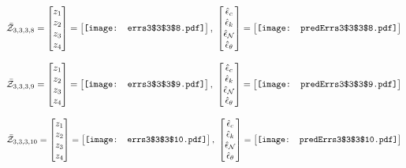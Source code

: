 \documentclass[12pt]{article}
\begin{document}
\begin{gather*}
\bar{\mathcal{Z}}_{3,3,3,8}=\begin{bmatrix}
z_1\\
z_2\\
z_3\\
z_4
 \end{bmatrix}= \begin{bmatrix}
\vcenter{\hbox{\texttt{[image: errs3\$3\$3\$8.pdf]}}}
 \end{bmatrix},\,\, \begin{bmatrix}
\hat{\epsilon}_c\\\hat{\epsilon}_k\\\hat{\epsilon}_\mathcal{N}\\\hat{\epsilon}_\theta
 \end{bmatrix}=\begin{bmatrix}
\vcenter{\hbox{\texttt{[image: predErrs3\$3\$3\$8.pdf]}}}
 \end{bmatrix}
\end{gather*}



\begin{gather*}
\bar{\mathcal{Z}}_{3,3,3,9}=\begin{bmatrix}
z_1\\
z_2\\
z_3\\
z_4
 \end{bmatrix}= \begin{bmatrix}
\vcenter{\hbox{\texttt{[image: errs3\$3\$3\$9.pdf]}}}
 \end{bmatrix},\,\, \begin{bmatrix}
\hat{\epsilon}_c\\\hat{\epsilon}_k\\\hat{\epsilon}_\mathcal{N}\\\hat{\epsilon}_\theta
 \end{bmatrix}=\begin{bmatrix}
\vcenter{\hbox{\texttt{[image: predErrs3\$3\$3\$9.pdf]}}}
 \end{bmatrix}
\end{gather*}

\begin{gather*}
\bar{\mathcal{Z}}_{3,3,3,10}=\begin{bmatrix}
z_1\\
z_2\\
z_3\\
z_4
 \end{bmatrix}= \begin{bmatrix}
\vcenter{\hbox{\texttt{[image: errs3\$3\$3\$10.pdf]}}}
 \end{bmatrix},\,\, \begin{bmatrix}
\hat{\epsilon}_c\\\hat{\epsilon}_k\\\hat{\epsilon}_\mathcal{N}\\\hat{\epsilon}_\theta
 \end{bmatrix}=\begin{bmatrix}
\vcenter{\hbox{\texttt{[image: predErrs3\$3\$3\$10.pdf]}}}
 \end{bmatrix}
\end{gather*}
\end{document}
